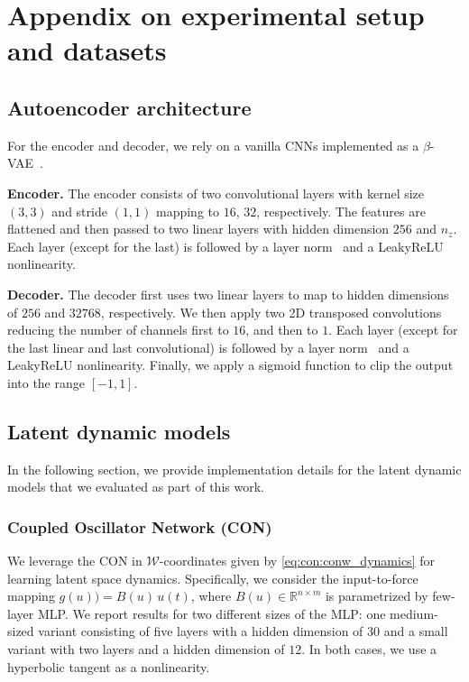 \section{Appendix on experimental setup and datasets}\label{sec:apx-con:experimental_setup}

\subsection{Autoencoder architecture}
For the encoder and decoder, we rely on a vanilla \glspl{CNN} implemented as a $\beta$-\gls{VAE}~\cite{kingma2014auto}.

\textbf{Encoder.} The encoder consists of two convolutional layers with kernel size $(3, 3)$ and stride $(1, 1)$ mapping to $16$, $32$, respectively.
The features are flattened and then passed to two linear layers with hidden dimension $256$ and $n_z$.
Each layer (except for the last) is followed by a layer norm~\cite{ba2016layer} and a LeakyReLU nonlinearity.

\textbf{Decoder.} The decoder first uses two linear layers to map to hidden dimensions of $256$ and $32768$, respectively.
We then apply two 2D transposed convolutions~\cite{dumoulin2016guide} reducing the number of channels first to $16$, and then to $1$.
Each layer (except for the last linear and last convolutional) is followed by a layer norm~\cite{ba2016layer} and a LeakyReLU nonlinearity.
Finally, we apply a sigmoid function to clip the output into the range $[-1, 1]$.

\subsection{Latent dynamic models}\label{sub:apx-con:latent_dynamic_models}
In the following section, we provide implementation details for the latent dynamic models that we evaluated as part of this work.

\subsubsection{Coupled Oscillator Network (CON)}\label{ssub:apx-con:latent_space_dynamic_models:con}
We leverage the \gls{CON} in $\mathcal{W}$-coordinates given by \eqref{eq:con:conw_dynamics} for learning latent space dynamics. 
Specifically, we consider the input-to-force mapping $g(u)) = B(u) \, u(t)$, where $B(u) \in \mathbb{R}^{n \times m}$ is parametrized by few-layer \gls{MLP}. We report results for two different sizes of the \gls{MLP}: one medium-sized variant consisting of five layers with a hidden dimension of $30$ and a small variant with two layers and a hidden dimension of $12$. In both cases, we use a hyperbolic tangent as a nonlinearity.


